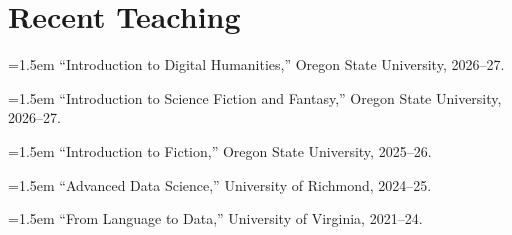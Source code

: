\documentclass[12pt, letterpaper]{article}
\newcommand{\entry}[1]{\hangindent=1.5em\hangafter=1 #1\par}
\newenvironment{tight}{\setlength{\parskip}{0pt}}{}
\begin{document}
\section{Recent Teaching}
\begin{tight}
\entry{``Introduction to Digital Humanities,'' Oregon State University, 2026--27.}
\entry{``Introduction to Science Fiction and Fantasy,'' Oregon State University, 2026--27.}
\entry{``Introduction to Fiction,'' Oregon State University, 2025--26.}
\entry{``Advanced Data Science,'' University of Richmond, 2024--25.}
\entry{``From Language to Data,'' University of Virginia, 2021--24.}
\end{tight}
\end{document}
